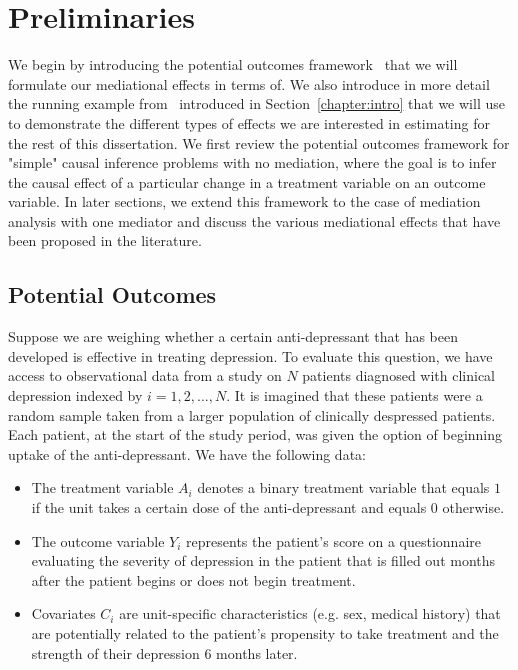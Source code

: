 \chapter{Preliminaries}\label{chapter:sample}

We begin by introducing the potential outcomes framework~\citep{rubin1974} that we will formulate 
our mediational effects in terms of. We also introduce in more detail the running example 
from~\cite{morenobetancur2018} introduced in Section~\ref{chapter:intro} that we will use to 
demonstrate the different types of effects we are interested in estimating for the rest of this
dissertation. We first review the potential outcomes framework for "simple"
causal inference problems with no mediation, where the goal is to infer the causal 
effect of a particular change in a treatment variable on an outcome variable. In later sections, we 
extend this framework to the case of mediation analysis with one mediator and discuss the 
various mediational effects that have been proposed in the literature. 

\section{Potential Outcomes}

Suppose we are weighing whether a certain anti-depressant that has been developed is effective in treating
depression. To evaluate this question, we have access to observational data from a study on $N$
patients diagnosed with clinical depression indexed by $i = 1, 2, ..., N$. It is imagined that
these patients were a random sample taken from a larger population of clinically despressed patients. Each patient,
at the start of the study period, was given the option of beginning uptake of the anti-depressant. 
We have the following data:
\begin{itemize}[noitemsep,topsep=0pt]
\item The treatment variable $A_{i}$ denotes a binary treatment variable that equals $1$ if the 
unit takes a certain dose of the anti-depressant and equals $0$ otherwise. 
\item The outcome variable $Y_{i}$ represents the patient's score on a questionnaire evaluating the severity 
of depression in the patient that is filled out months after the patient begins or does not begin treatment. 
\item Covariates $C_{i}$ are unit-specific characteristics (e.g. sex, medical history) that are potentially 
related to the patient's propensity to take treatment and the strength of their depression 6 months later. 
\end{itemize}

